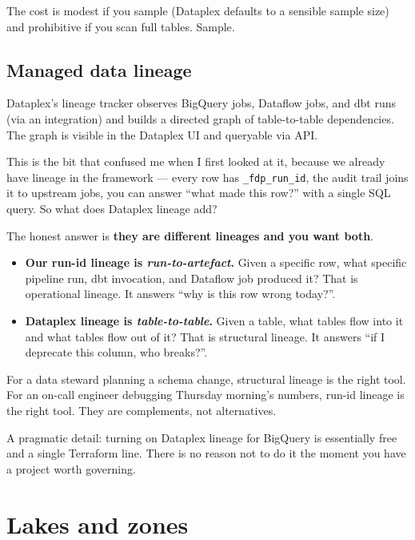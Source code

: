 \documentclass[
  11pt,
  british,
  oneside]{book}
\providecommand{\tightlist}{%
  \setlength{\itemsep}{0pt}\setlength{\parskip}{0pt}}
\begin{document}
The cost is modest if you sample (Dataplex defaults to a sensible sample
size) and prohibitive if you scan full tables. Sample.

\hypertarget{managed-data-lineage}{%
\subsection{Managed data lineage}\label{managed-data-lineage}}

Dataplex's lineage tracker observes BigQuery jobs, Dataflow jobs, and
dbt runs (via an integration) and builds a directed graph of
table-to-table
dependencies. The graph
is visible in the Dataplex UI and queryable via API.

This is the bit that confused me when I first looked at it, because we
already have lineage in the framework --- every row has
\texttt{\_fdp\_run\_id}, the audit trail joins it to upstream jobs, you
can answer ``what made this row?'' with a single SQL query. So what does
Dataplex lineage add?

The honest answer is \textbf{they are different lineages and you want
both}.

\begin{itemize}
\tightlist
\item
  \textbf{Our run-id lineage is \emph{run-to-artefact}.} Given a
  specific row, what specific pipeline run, dbt invocation, and Dataflow
  job produced it? That is operational lineage. It answers ``why is this
  row wrong today?''.
\item
  \textbf{Dataplex lineage is \emph{table-to-table}.} Given a table,
  what tables flow into it and what tables flow out of it? That is
  structural lineage. It answers ``if I deprecate this column, who
  breaks?''.
\end{itemize}

For a data steward planning a schema change, structural lineage is the
right tool. For an on-call engineer debugging Thursday morning's
numbers, run-id lineage is the right tool. They are complements, not
alternatives.

A pragmatic detail: turning on Dataplex lineage for BigQuery is
essentially free and a single Terraform line. There is no reason not to
do it the moment you have a project worth governing.

\hypertarget{lakes-and-zones}{%
\section{Lakes and zones}\label{lakes-and-zones}}
\end{document}
